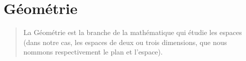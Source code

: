 \part{Géométrie}

\vspace{5em}

\begin{quote}
    La Géométrie est la branche de la mathématique qui étudie les espaces (dans notre cas, les espaces de deux ou trois dimensions, que nous nommons respectivement le plan et l'espace).
\end{quote}

\clearpage